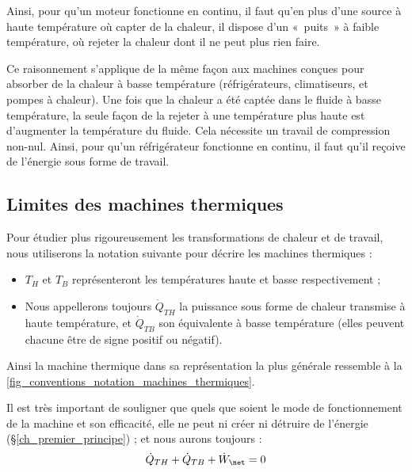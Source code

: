 		Ainsi, pour qu’un moteur fonctionne en continu, il faut qu’en plus d’une source à haute température où capter de la chaleur, il dispose d’un «~puits~» à faible température, où rejeter la chaleur dont il ne peut plus rien faire.

		Ce raisonnement s’applique de la même façon aux machines conçues pour absorber de la chaleur à basse température (réfrigérateurs, climatiseurs, et pompes à chaleur). Une fois que la chaleur a été captée dans le fluide à basse température, la seule façon de la rejeter à une température plus haute est d’augmenter la température du fluide. Cela nécessite un travail de compression non-nul. Ainsi, pour qu’un réfrigérateur fonctionne en continu, il faut qu’il reçoive de l’énergie sous forme de travail.


	\subsection{Limites des machines thermiques}
	\label{ch_limites_machines_thermiques}
	
		Pour étudier plus rigoureusement les transformations de chaleur et de travail, nous utiliserons la notation suivante pour décrire les machines thermiques :

		\begin{itemize}
			\item $T_H$ et $T_B$ représenteront les températures haute et basse respectivement ;
			\item Nous appellerons toujours $\dot Q_{TH}$ la puissance sous forme de chaleur transmise à haute température, et $\dot Q_{TB}$ son équivalente à basse température (elles peuvent chacune être de signe positif ou négatif).
		\end{itemize}

		Ainsi la machine thermique dans sa représentation la plus générale ressemble à la \cref{fig_conventions_notation_machines_thermiques}.

		Il est très important de souligner que quels que soient le mode de fonctionnement de la machine et son efficacité, elle ne peut ni créer ni détruire de l’énergie (\S\ref{ch_premier_principe}) ; et nous aurons toujours :
		\begin{equation}
			\dot Q_{TH} + \dot Q_{TB} + \dot W_\net = 0
			\label{eq_premier_principe_machines}
		\end{equation}

